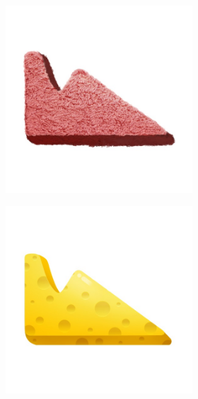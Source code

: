 \begin{figure}[h!]
    \begin{center}
        \begin{subfigure}[b]{0.15\textwidth}
            \begin{center}
                \begin{subfigure}[b]{0.9\textwidth}
                    \includegraphics[width=\linewidth]{figures/artist_objects/fake1_carpet_red.jpg}
                \end{subfigure}
                \begin{subfigure}[b]{0.9\textwidth}
                    \includegraphics[width=\linewidth]{figures/artist_objects/fake1_sponge_yellow.jpg}

\end{subfigure}
\end{center}
\end{subfigure}
\end{center}
\end{figure}
